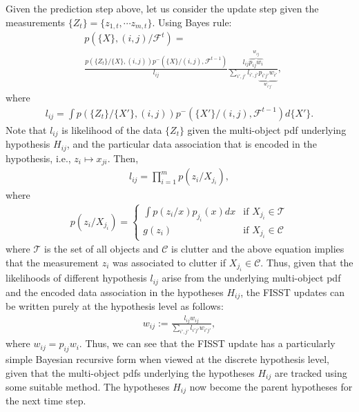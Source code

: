\documentclass[10pt, conference]{IEEEtran}
\begin{document}
Given the prediction step above, let us consider the update step given the measurements $\{Z_t\} = \{z_{1,t},\cdots z_{m,t}\}$. 
Using Bayes rule:
\begin{align}\label{FISST_M}
&p(\{X\}, (i,j)/ \mathcal{F}^t) = \nonumber\\
&\frac{p(\{Z_t\}/ \{X\}, (i,j))p^-(\{X\}/ (i,j), \mathcal{F}^{t-1})}{l_{ij}}
\frac{l_{ij}\overbrace{p_{ij}w_i}^{w_{ij}}}{\sum_{i',j'} l_{i',j'} \underbrace{p_{i'j'}w_{i'}}_{w_{i'j'}}},
\end{align}
where
\begin{align}
l_{ij} = \int p(\{Z_t\}/ \{X'\}, (i,j))p^-(\{X'\}/ (i,j), \mathcal{F}^{t-1}) d\{X'\}.
\end{align}
Note that $l_{ij}$ is likelihood of the data $\{Z_t\}$ given the multi-object pdf underlying hypothesis $H_{ij}$, and the particular data association that is encoded in the hypothesis, i.e., $z_{i}\mapsto{x_{ji}}$. Then,
\begin{align}\label{hyp_likelihood}
l_{ij} = \prod_{i=1}^m p(z_i/ X_{j_i}),
\end{align}
where
\begin{align}
p(z_i/ X_{j_i}) = 
\begin{cases}
    \int p(z_i/ x) p_{j_i}(x) dx & \text{if } X_{j_i} \in \mathcal{T}\\
    g(z_i)  & \text{if }  X_{j_i} \in \mathcal{C} 
    \end{cases}
\end{align}
where $\mathcal{T}$ is the set of all objects and $\mathcal{C}$ is clutter and the above equation implies that the measurement $z_i$ was associated to clutter if $X_{j_i} \in \mathcal{C}$.
Thus, given that the likelihoods of different hypothesis $l_{ij}$ arise from the underlying multi-object pdf and the encoded data association in the hypotheses $H_{ij}$, the FISST updates can be written purely at the hypothesis level as follows:
\begin{align}\label{FISST_M'}
w_{ij} := \frac{l_{ij}w_{ij}}{\sum_{i',j'} l_{i'j'}w_{i'j'}},
\end{align}
where $w_{ij} = p_{ij}w_i$. Thus, we can see that the FISST update has a particularly simple Bayesian recursive form when viewed at the discrete hypothesis level, given that the multi-object pdfs underlying the hypotheses $H_{ij}$ are tracked using some suitable method. 
The hypotheses $H_{ij}$ now become the parent hypotheses for the next time step.
\end{document}
